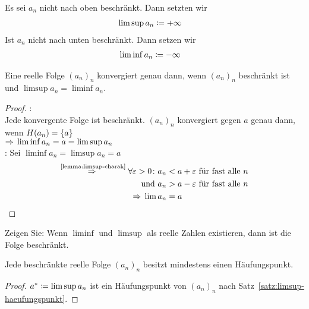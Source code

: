 \begin{notation}
    Es sei $a_n$ nicht nach oben beschränkt. Dann setzten wir
    \begin{align*}
        \limsup a_n &\coloneqq +\infty
    \end{align*}
    Ist $a_n$ nicht nach unten beschränkt. Dann setzen wir
    \begin{align*}
        \liminf a_n &\coloneqq -\infty
    \end{align*}
\end{notation}

\begin{korollar}
    Eine reelle Folge $(a_n)_n$ konvergiert genau dann, wenn $(a_n)_n$ beschränkt ist und $\limsup a_n = \liminf a_n$.
    \begin{proof}
        \anf{$\impl$}:\\
        Jede konvergente Folge ist beschränkt. $(a_n)_n$ konvergiert gegen $a$ genau dann, wenn $H(a_n) = \left\{a\right\}$\\
        $\Rightarrow{} \liminf a_n = a = \limsup a_n$\\[10pt]
        \anf{$\Leftarrow$}: Sei $\liminf a_n = \limsup a_n = a$
        \begin{align*}
            \overset{\text{\ref{lemma:limsup-charak}}}{\Rightarrow{}} \forall \varepsilon > 0\colon a_n &< a+\varepsilon \text{ für fast alle $n$}\\
            \text{ und } a_n &> a-\varepsilon \text{ für fast alle } n\\
            \Rightarrow{} \lim a_n &= a\qedhere
        \end{align*}
    \end{proof}
\end{korollar}

\begin{uebung}
    Zeigen Sie: Wenn $\liminf$ und $\limsup$ als reelle Zahlen existieren, dann ist die Folge beschränkt.
\end{uebung}

\begin{satz} %
    \label{satz:bolzano-weierstrass}
    Jede beschränkte reelle Folge $(a_n)_n$ besitzt mindestens einen Häufungspunkt.

    \begin{proof}
        $a^* \coloneqq \limsup a_n$ ist ein Häufungspunkt von $(a_n)_n$ nach Satz~\ref{satz:limsup-haeufungspunkt}.
    \end{proof}
\end{satz}

